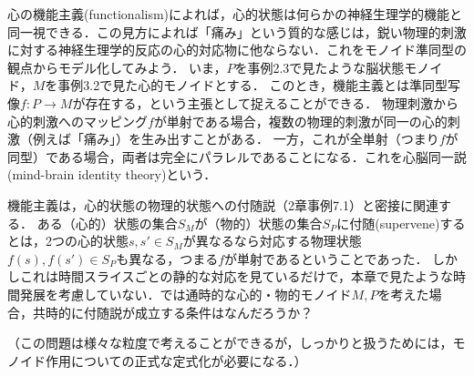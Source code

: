 \documentclass[11pt,a4paper,uplatex]{jsarticle}
\begin{document}
\begin{example}
    心の機能主義(functionalism)によれば，心的状態は何らかの神経生理学的機能と同一視できる．この見方によれば「痛み」という質的な感じは，鋭い物理的刺激に対する神経生理学的反応の心的対応物に他ならない．これをモノイド準同型の観点からモデル化してみよう．
    いま，$P$を事例2.3で見たような脳状態モノイド，$M$を事例3.2で見た心的モノイドとする．
    このとき，機能主義とは準同型写像$f:P \to M$が存在する，という主張として捉えることができる．
    物理刺激から心的刺激へのマッピング$f$が単射である場合，複数の物理的刺激が同一の心的刺激（例えば「痛み」）を生み出すことがある．
    一方，これが全単射（つまり$f$が同型）である場合，両者は完全にパラレルであることになる．これを心脳同一説(mind-brain identity theory)という．
\end{example}

\begin{exercise}
    機能主義は，心的状態の物理的状態への付随説（2章事例7.1）と密接に関連する．
    ある（心的）状態の集合$S_M$が（物的）状態の集合$S_P$に付随(supervene)するとは，2つの心的状態$s, s' \in S_M$が異なるなら対応する物理状態$f(s), f(s') \in S_P$も異なる，つまる$f$が単射であるということであった．
    しかしこれは時間スライスごとの静的な対応を見ているだけで，本章で見たような時間発展を考慮していない．では通時的な心的・物的モノイド$M, P$を考えた場合，共時的に付随説が成立する条件はなんだろうか？

    （この問題は様々な粒度で考えることができるが，しっかりと扱うためには，モノイド作用についての正式な定式化が必要になる．）
\end{exercise}
\end{document}
